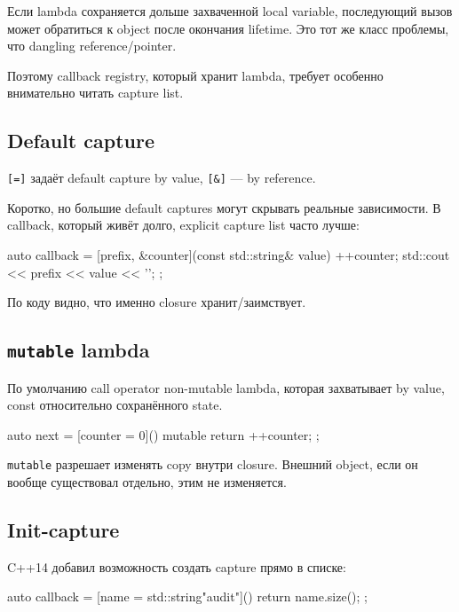 \begin{warningbox}
Если lambda сохраняется дольше захваченной local variable, последующий вызов
может обратиться к object после окончания lifetime. Это тот же класс проблемы,
что dangling reference/pointer.
\end{warningbox}

Поэтому callback registry, который хранит lambda, требует особенно внимательно
читать capture list.

\subsection{Default capture}

\texttt{[=]} задаёт default capture by value, \texttt{[\&]} --- by reference.

Коротко, но большие default captures могут скрывать реальные зависимости.
В callback, который живёт долго, explicit capture list часто лучше:

\begin{cppcode}
auto callback = [prefix, &counter](const std::string& value) {
    ++counter;
    std::cout << prefix << value << '\n';
};
\end{cppcode}

По коду видно, что именно closure хранит/заимствует.

\subsection{\texttt{mutable} lambda}

По умолчанию call operator non-mutable lambda, которая захватывает by value,
const относительно сохранённого state.

\begin{cppcode}
auto next = [counter = 0]() mutable {
    return ++counter;
};
\end{cppcode}

\texttt{mutable} разрешает изменять copy внутри closure. Внешний object, если он
вообще существовал отдельно, этим не изменяется.

\subsection{Init-capture}

C++14 добавил возможность создать capture прямо в списке:

\begin{cppcode}
auto callback =
    [name = std::string{"audit"}]() {
        return name.size();
    };
\end{cppcode}

